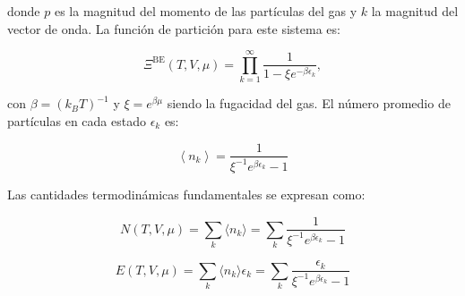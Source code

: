 donde $p$ es la magnitud del momento de las partículas del gas y $k$ la magnitud del vector de onda. La función de partición para este sistema es:

\begin{equation}\label{eq-partfunc}
{\Xi}^{\mathrm{BE}}\left(T,V,\mu\right) = \prod_{k=1}^{\infty}\frac{1}{1-\xi {e}^{-\beta {\epsilon}_{k}}},
\end{equation}

con $\beta = (k_B T)^{-1}$ y $\xi = e^{\beta\mu}$ siendo la fugacidad del gas. El número promedio de partículas en cada estado ${\epsilon}_k$ es:



\begin{equation}
    \left\langle {n}_{k} \right\rangle = \frac{1}{{\xi}^{-1}{e}^{\beta{\epsilon}_{k}}-1} 
\end{equation}

Las cantidades termodinámicas fundamentales se expresan como:

\begin{equation}\label{eq-BE-Ntotal}
N(T,V,\mu) = \sum_k \langle n_k \rangle = \sum_k \frac{1}{{\xi}^{-1}{e}^{\beta{\epsilon}_{k}}-1}
\end{equation}

\begin{equation}\label{eq-BE-Etotal}
E(T,V,\mu) = \sum_k \langle n_k \rangle \epsilon_k = \sum_k \frac{\epsilon_k}{{\xi}^{-1}{e}^{\beta{\epsilon}_{k}}-1}
\end{equation}



